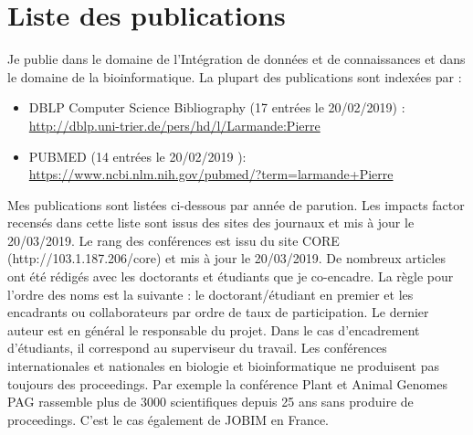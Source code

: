 \chapter{Liste des publications}
Je publie dans le domaine de l’Intégration de données et de connaissances et dans le domaine de la bioinformatique. La plupart des publications sont indexées par :

\begin{itemize}
\item DBLP Computer Science Bibliography (17 entrées le 20/02/2019) : \\
\url{http://dblp.uni-trier.de/pers/hd/l/Larmande:Pierre}
\item PUBMED (14 entrées le  20/02/2019 ): \\
\url{https://www.ncbi.nlm.nih.gov/pubmed/?term=larmande+Pierre}
\end{itemize}

\vspace{0.5cm}
Mes publications sont listées ci-dessous par année de parution. Les impacts factor recensés dans cette liste sont issus des sites des journaux et mis à jour le 20/03/2019. Le rang des conférences est issu du site CORE (http://103.1.187.206/core) et mis à jour le 20/03/2019.
De nombreux articles ont été rédigés avec les doctorants et étudiants que je co-encadre. La règle pour l’ordre des noms est la suivante : le doctorant/étudiant en premier et les encadrants ou collaborateurs par ordre de taux de participation. Le dernier auteur est en général le responsable du projet. Dans le cas d'encadrement d'étudiants, il correspond au superviseur du travail.
Les conférences internationales et nationales en biologie et bioinformatique ne produisent pas toujours des proceedings. Par exemple la conférence Plant et Animal Genomes PAG rassemble plus de 3000 scientifiques depuis 25 ans sans produire de proceedings. C’est le cas également de JOBIM en France. 

